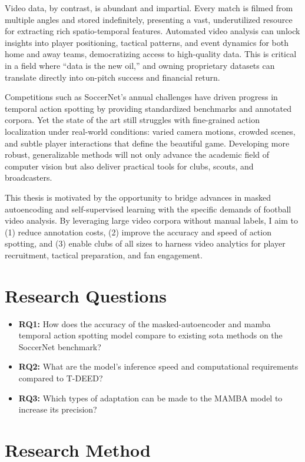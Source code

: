 Video data, by contrast, is abundant and impartial. Every match is filmed from multiple angles and stored indefinitely, presenting a vast, underutilized resource for extracting rich spatio-temporal features. Automated video analysis can unlock insights into player positioning, tactical patterns, and event dynamics for both home and away teams, democratizing access to high-quality data. This is critical in a field where “data is the new oil,” and owning proprietary datasets can translate directly into on-pitch success and financial return.  

Competitions such as SoccerNet's annual challenges have driven progress in temporal action spotting by providing standardized benchmarks and annotated corpora. Yet the state of the art still struggles with fine-grained action localization under real-world conditions: varied camera motions, crowded scenes, and subtle player interactions that define the beautiful game. Developing more robust, generalizable methods will not only advance the academic field of computer vision but also deliver practical tools for clubs, scouts, and broadcasters.  

This thesis is motivated by the opportunity to bridge advances in masked autoencoding and self-supervised learning with the specific demands of football video analysis. By leveraging large video corpora without manual labels, I aim to (1) reduce annotation costs, (2) improve the accuracy and speed of action spotting, and (3) enable clubs of all sizes to harness video analytics for player recruitment, tactical preparation, and fan engagement.  

\section{Research Questions}
\label{sec:research_questions}
\begin{itemize}
    \item \textbf{RQ1:} How does the accuracy of the masked-autoencoder and mamba temporal action spotting model compare to existing \acrlong{sota} methods on the SoccerNet benchmark?
    \item \textbf{RQ2:} What are the model's inference speed and computational requirements compared to T-DEED?
    \item \textbf{RQ3:} Which types of adaptation can be made to the MAMBA model to increase its precision?
\end{itemize}

\section{Research Method}

